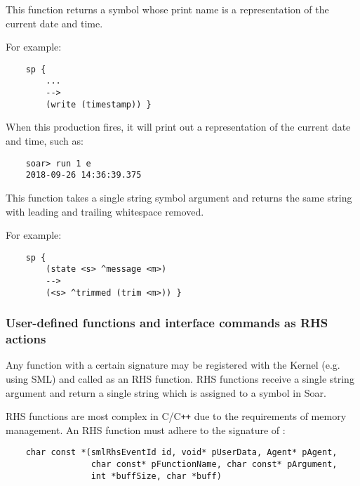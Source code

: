 \begin{description}
\item [\soarb{timestamp} --- ]
	This function returns a symbol whose print name is a representation of the current date and time.

	For example:

	\begin{verbatim}
	sp {
	    ...
	    -->
	    (write (timestamp)) }
	\end{verbatim}

	When this production fires, it will print out a representation of the current date and time, such as:

	\begin{verbatim}
	soar> run 1 e
	2018-09-26 14:36:39.375
	\end{verbatim}


\item [\soarb{trim} --- ]
	This function takes a single string symbol argument and returns the same string with leading and trailing whitespace removed.

	For example:

	\begin{verbatim}
	sp {
	    (state <s> ^message <m>)
	    -->
	    (<s> ^trimmed (trim <m>)) }
	\end{verbatim}

\end{description}

\subdivider
\subsubsection*{User-defined functions and interface commands as RHS actions}

Any function with a certain signature may be registered with the Kernel (e.g. using SML) and called as an RHS function.
RHS functions receive a single string argument and return a single string which is assigned to a symbol in Soar.

RHS functions are most complex in C/C\texttt{++} due to the requirements of memory management.
An RHS function must adhere to the signature of :

\begin{verbatim}
	char const *(smlRhsEventId id, void* pUserData, Agent* pAgent,
				 char const* pFunctionName, char const* pArgument,
				 int *buffSize, char *buff)
\end{verbatim}

